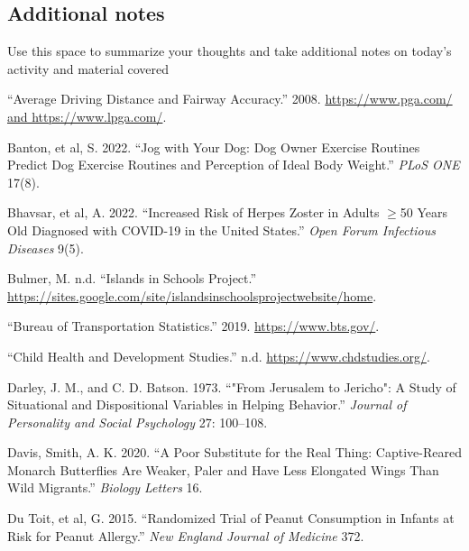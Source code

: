 \documentclass[
]{report}
\newlength{\cslhangindent}
\newenvironment{CSLReferences}[2] %
 {\begin{list}{}{%
  \setlength{\itemindent}{0pt}
  \setlength{\leftmargin}{0pt}
  \setlength{\parsep}{0pt}
  \ifodd #1
   \setlength{\leftmargin}{\cslhangindent}
   \setlength{\itemindent}{-1\cslhangindent}
  \fi
  \setlength{\itemsep}{#2\baselineskip}}}
 {\end{list}}
\begin{document}
\subsection{Additional notes}\label{additional-notes-10}

Use this space to summarize your thoughts and take additional notes on today's activity and material covered

\newpage

\label{refs}
\begin{CSLReferences}{1}{0}
{``Average Driving Distance and Fairway Accuracy.''} 2008. \href{https://www.pga.com/\%20and\%20https://www.lpga.com/}{https://www.pga.com/ and https://www.lpga.com/}.

Banton, et al, S. 2022. {``Jog with Your Dog: Dog Owner Exercise Routines Predict Dog Exercise Routines and Perception of Ideal Body Weight.''} \emph{PLoS ONE} 17(8).

Bhavsar, et al, A. 2022. {``Increased Risk of Herpes Zoster in Adults \(\geq\)50 Years Old Diagnosed with COVID-19 in the United States.''} \emph{Open Forum Infectious Diseases} 9(5).

Bulmer, M. n.d. {``Islands in Schools Project.''} \url{https://sites.google.com/site/islandsinschoolsprojectwebsite/home}.

{``Bureau of Transportation Statistics.''} 2019. \url{https://www.bts.gov/}.

{``Child Health and Development Studies.''} n.d. \url{https://www.chdstudies.org/}.

Darley, J. M., and C. D. Batson. 1973. {``"From Jerusalem to Jericho": A Study of Situational and Dispositional Variables in Helping Behavior.''} \emph{Journal of Personality and Social Psychology} 27: 100--108.

Davis, Smith, A. K. 2020. {``A Poor Substitute for the Real Thing: Captive-Reared Monarch Butterflies Are Weaker, Paler and Have Less Elongated Wings Than Wild Migrants.''} \emph{Biology Letters} 16.

Du Toit, et al, G. 2015. {``Randomized Trial of Peanut Consumption in Infants at Risk for Peanut Allergy.''} \emph{New England Journal of Medicine} 372.


\end{CSLReferences}
\end{document}
